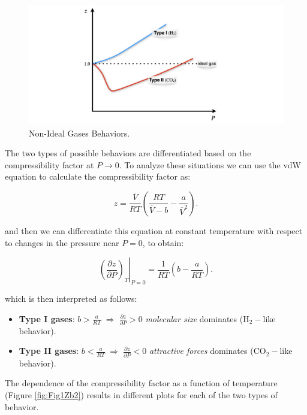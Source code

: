 \documentclass[
  9pt,
]{extbook}
\providecommand{\tightlist}{%
  \setlength{\itemsep}{0pt}\setlength{\parskip}{0pt}}
\theoremstyle{definition}
\theoremstyle{definition}
\theoremstyle{definition}
\theoremstyle{definition}
\theoremstyle{remark}
\begin{document}
\begin{figure}

{\centering \includegraphics[width=0.8\linewidth]{./img/OEP_Figures.012} 

}

\caption{Non-Ideal Gases Behaviors.}\label{fig:FigZb}
\end{figure}

The two types of possible behaviors are differentiated based on the compressibility factor at \(P\rightarrow 0\). To analyze these situations we can use the vdW equation to calculate the compressibility factor as:

\begin{equation}
z= \frac{\overline{V}}{RT} \left( \frac{RT}{\overline{V}-b} -\frac{a}{\overline{V}^2} \right).
\label{eq:compr1}
\end{equation}

and then we can differentiate this equation at constant temperature with respect to changes in the pressure near \(P=0\), to obtain:

\begin{equation}
\left. \left( \frac{\partial z}{\partial P}\right)_T \right|_{P=0} = \frac{1}{RT} \left( b -\frac{a}{RT} \right).
\label{eq:compr2}
\end{equation}

which is then interpreted as follows:

\begin{itemize}
\tightlist
\item
  \textbf{Type I gases}: \(b>\frac{a}{RT} \; \Rightarrow \; \frac{\partial z}{\partial P} > 0\) \emph{molecular size} dominates (\(\mathrm{H}_2-\)like behavior).
\item
  \textbf{Type II gases}: \(b<\frac{a}{RT} \; \Rightarrow \; \frac{\partial z}{\partial P} < 0\) \emph{attractive forces} dominates (\(\mathrm{CO}_2-\)like behavior).
\end{itemize}

The dependence of the compressibility factor as a function of temperature (Figure \ref{fig:Fig1Zb2}) results in different plots for each of the two types of behavior.
\end{document}
